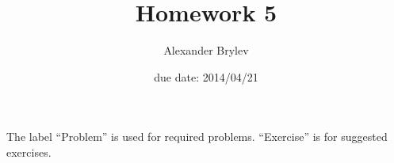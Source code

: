 
         \newcommand\alg[1]{\ensuremath{\mathbf{#1}}}
         \newcommand{\<}{\ensuremath{\langle}}
         \renewcommand{\>}{\ensuremath{\rangle}}
         \newcommand\fld[1]{\ensuremath{\mathbb{#1}}}
         \newcommand\Z{\fld{Z}}
         \newcommand\GF{\ensuremath{\operatorname{GF}}}
         \author{Alexander Brylev}
         \title{Homework 5}
         \date{due date: 2014/04/21}



\maketitle

\noindent The label ``Problem'' is used for required problems. ``Exercise''
is for suggested exercises.

